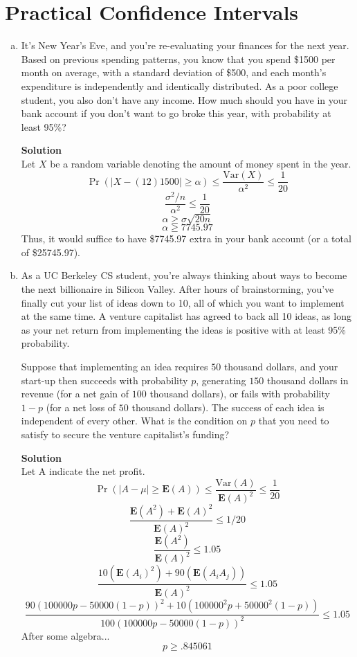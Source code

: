\documentclass[11pt]{article}
\newcommand*{\Question}[1]{\section{#1}}
\newenvironment{Answer}{\vspace{10pt}\begin{mdframed}\textbf{Solution}\\}{\end{mdframed}\vfill\pagebreak[3]}
\newenvironment{Answer}{\vspace{10pt}}{\vfill\pagebreak[3]}
\newcommand*{\E}{\textbf{E}}
\newcommand*{\Var}[1]{\text{Var}(#1)}
\begin{document}
\Question{Practical Confidence Intervals}
\begin{enumerate}[(a)]
  \item It's New Year's Eve, and you're re-evaluating your finances for the next year. Based on previous spending patterns, you know that you spend \$1500 per month on average, with a standard deviation of \$500, and each month's expenditure is independently and identically distributed. As a poor college student, you also don't have any income. How much should you have in your bank account if you don't want to go broke this year, with probability at least 95\%?
  \begin{Answer}
    Let $X$ be a random variable denoting the amount of money spent in the year.
    $$\Pr(|X-(12)1500|\geq \alpha)\leq \frac{\Var{X}}{\alpha^2}\leq \frac{1}{20}$$
    $$\frac{\sigma^2/n}{\alpha^2}\leq \frac{1}{20}$$
    $$\alpha \geq \sigma\sqrt{20n}$$
    $$\alpha \geq 7745.97$$
    Thus, it would suffice to have \$7745.97 extra in your bank account (or a total of \$25745.97).
  \end{Answer}
  
  \item As a UC Berkeley CS student, you're always thinking about ways to become the next billionaire in Silicon Valley. After hours of brainstorming, you've finally cut your list of ideas down to 10, all of which you want to implement at the same time. A venture capitalist has agreed to back all 10 ideas, as long as your net return from implementing the ideas is positive with at least 95\% probability.
  
  Suppose that implementing an idea requires $50$ thousand dollars, and your start-up then succeeds with probability $p$, generating $150$ thousand dollars in revenue (for a net gain of $100$ thousand dollars), or fails with probability $1 - p$ (for a net loss of $50$ thousand dollars). The success of each idea is independent of every other. What is the condition on $p$ that you need to satisfy to secure the venture capitalist's funding?
  \begin{Answer}
  Let A indicate the net profit.
$$\Pr(|A-\mu|\geq \E(A))\leq \frac{\Var{A}}{\E(A)^2}\leq \frac{1}{20}$$
$$\frac{\E(A^2)+\E(A)^2}{\E(A)^2}\leq 1/20$$
$$\frac{\E(A^2)}{\E(A)^2}\leq 1.05$$
$$\frac{10(\E(A_i)^2)+90(\E(A_iA_j))}{\E(A)^2}\leq 1.05$$
$$\frac{90(100000p-50000(1-p))^2+10(100000^2p+50000^2(1-p))}{100(100000p-50000(1-p))^2}\leq 1.05$$
After some algebra...
$$p\geq .845061$$
  \end{Answer}
  

\end{enumerate}
\end{document}
